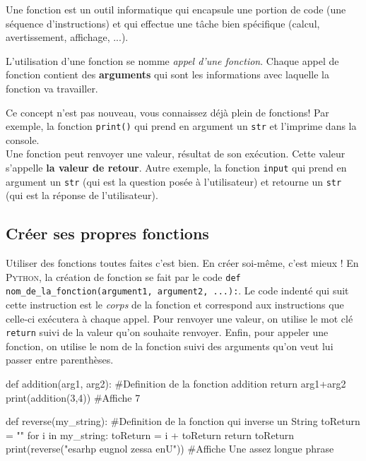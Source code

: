 Une fonction est un outil informatique qui encapsule une portion de code (une séquence d'instructions) et qui effectue une tâche bien spécifique (calcul, avertissement, affichage, ...).

L'utilisation d'une fonction se nomme \textit{appel d'une fonction}. Chaque appel de fonction contient des \textbf{arguments} qui sont les informations avec laquelle la fonction va travailler.

 Ce concept n'est pas nouveau, vous connaissez déjà plein de fonctions! Par exemple, la fonction \texttt{print()} qui prend en argument un \texttt{str} et l'imprime dans la console. \\
 
 Une fonction peut renvoyer une valeur, résultat de son exécution. Cette valeur s'appelle \textbf{la valeur de retour}. Autre exemple, la fonction \texttt{input} qui prend en argument un \texttt{str} (qui est la question posée à l'utilisateur) et retourne un \texttt{str} (qui est la réponse de l'utilisateur).\\
 
 \subsection{Créer ses propres fonctions}
 Utiliser des fonctions toutes faites c'est bien. En créer soi-même, c'est mieux ! 
 En \textsc{Python}, la création de fonction se fait par le code \texttt{def nom\_de\_la\_fonction(argument1, argument2, ...):}. Le code indenté qui suit cette instruction est le \textit{corps} de la fonction et correspond aux instructions que celle-ci exécutera à chaque appel. Pour renvoyer une valeur, on utilise le mot clé \texttt{return} suivi de la valeur qu'on souhaite renvoyer. Enfin, pour appeler une fonction, on utilise le nom de la fonction suivi des arguments qu'on veut lui passer entre parenthèses.
 
\begin{python}[caption = Exemple 1 : La fonction addition]
def addition(arg1, arg2): #Definition de la fonction addition
	return arg1+arg2
print(addition(3,4)) #Affiche 7
\end{python}
\begin{python}[caption = Exemple 2 : La fonction reverse]
def reverse(my_string): #Definition de la fonction qui inverse un String
	toReturn = ""
	for i in my_string:
		toReturn = i + toReturn
	return toReturn
print(reverse("esarhp eugnol zessa enU")) #Affiche Une assez longue phrase 
\end{python}

